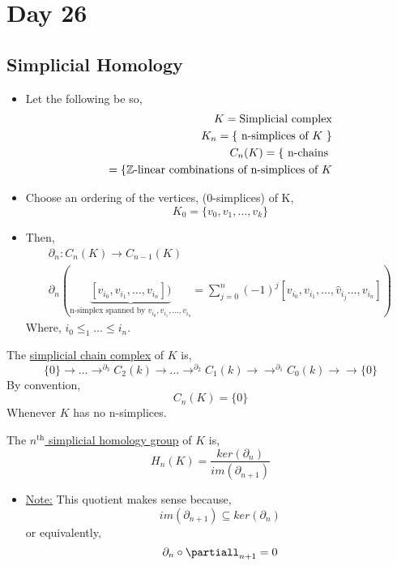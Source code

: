 \documentclass[../notes.tex]{subfiles}
\begin{document}
\section{Day 26}
\subsection{Simplicial Homology}
\begin{itemize}
    \item Let the following be so,
        \begin{align*}
            K=\text{Simplicial complex}\\
            K_n=\{\text{ n-simplices of $K$ }\}\\
            C_n(K)=\{\text{ n-chains }\\
            =\{\text{$\mathbb{Z}$-linear combinations of n-simplices of $K$}\\
        \end{align*}
    \item Choose an ordering of the vertices, (0-simplices) of K,
        \[
            K_0=\{v_0,v_1,\dots,v_k\}
        \]
    \item Then,
        \begin{align*}
            \partial_n:C_n(K)\rightarrow C_{n-1}(K)\\
            \partial_n(\underbrace{[v_{i_0},v_{i_1},\dots,v_{i_n}])}_{\text{
                    n-simplex spanned by $v_{i_0},v_{i_1},\dots,v_{i_n}$}}
                =
            \sum_{j=0}^n(-1)^j[v_{i_0},v_{i_1},\dots,\hat{v}_{i_j}\dots,v_{i_n}])
        \end{align*}
        Where, $i_0\le_1\dots\le i_n$.
\end{itemize}
\begin{definition}
    The \underline{simplicial chain complex} of $K$ is,
    \[
        \{0\}\rightarrow\dots \rightarrow^{\partial_3}C_2(k)
        \rightarrow\dots \rightarrow^{\partial_2}C_1(k)
        \rightarrow \rightarrow^{\partial_1}C_0(k)
        \rightarrow \rightarrow \{0\}
    \]
    By convention,
    \[
        C_n(K)=\{0\}
    \]
    Whenever $K$ has no n-simplices.
\end{definition}
\begin{definition}
    The \underline{$n^{\text{th}}$ simplicial homology group} of $K$ is,
    \[
        H_n(K)=\frac{ker(\partial_n)}{im(\partial_{n+1})}
    \]
\end{definition}
\begin{itemize}
    \item \underline{Note:} This quotient makes sense because,
        \[
            im(\partial_{n+1})\subseteq ker(\partial_n)
        \]
        or equivalently,
        \[
            \partial_n \circ \partiall_{n+1}=0
        \]
\end{itemize}
\end{document}
